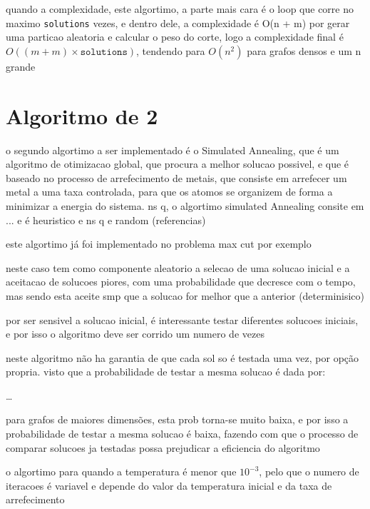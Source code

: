 \documentclass[mirror, portugues]{revdetua}
\begin{document}
quando a complexidade, este algortimo, a parte mais cara é o loop que corre no maximo \texttt{solutions} vezes, e dentro dele, a complexidade é O(n + m) por gerar uma particao aleatoria e calcular o peso do corte, logo a complexidade final é $O((m + m) \times \texttt{solutions})$, tendendo para $O(n^2)$ para grafos densos e um n grande




\section{Algoritmo de 2}


o segundo algortimo a ser implementado é o Simulated Annealing, que é um algoritmo de otimizacao global, que procura a melhor solucao possivel, e que é baseado no processo de arrefecimento de metais, que consiste em arrefecer um metal a uma taxa controlada, para que os atomos se organizem de forma a minimizar a energia do sistema. ns q, o algortimo simulated Annealing consite em ... e é heuristico e ns q e random (referencias)

este algortimo já foi implementado no problema max cut por exemplo \cite{SAT15}

neste caso tem como componente aleatorio a selecao de uma solucao inicial e a aceitacao de solucoes piores, com uma probabilidade que decresce com o tempo, mas sendo esta aceite smp que a solucao for melhor que a anterior (determinisico)

por ser sensivel a solucao inicial, é interessante testar diferentes solucoes iniciais, e por isso o algoritmo deve ser corrido um numero de vezes

neste algoritmo não ha garantia de que cada sol so é testada uma vez, por opção propria. visto que a probabilidade de testar a mesma solucao é dada por:

\dots

para grafos de maiores dimensões, esta prob torna-se muito baixa, e por isso a probabilidade de testar a mesma solucao é baixa, fazendo com que o processo de comparar solucoes ja testadas possa prejudicar a eficiencia do algoritmo 

o algortimo para quando a temperatura é menor que $10^{-3}$, pelo que o numero de iteracoes é variavel e depende do valor da temperatura inicial e da taxa de arrefecimento
\end{document}
